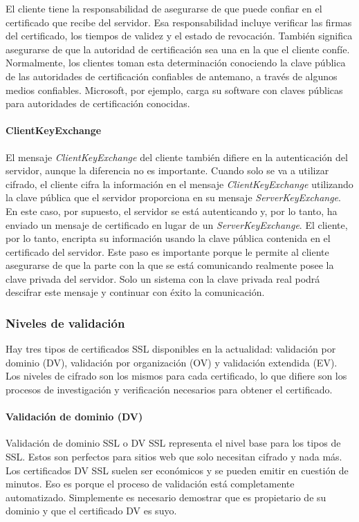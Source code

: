 El cliente tiene la responsabilidad de asegurarse de que puede confiar 
en el certificado que recibe del servidor. Esa responsabilidad incluye 
verificar las firmas del certificado, los tiempos de validez y el estado 
de revocación. También significa asegurarse de que la autoridad de 
certificación sea una en la que el cliente confíe. Normalmente, los clientes 
toman esta determinación conociendo la clave pública de las autoridades de 
certificación confiables de antemano, a través de algunos medios confiables. 
Microsoft, por ejemplo, carga su software con claves públicas para 
autoridades de certificación conocidas.

\paragraph*{ClientKeyExchange}
El mensaje \emph{ClientKeyExchange} del cliente también difiere en la autenticación 
del servidor, aunque la diferencia no es importante. Cuando solo se va a 
utilizar cifrado, el cliente cifra la información en el mensaje 
\emph{ClientKeyExchange}
utilizando la clave pública que el servidor proporciona en su mensaje 
\emph{ServerKeyExchange}. En este caso, por supuesto, el servidor se está 
autenticando y, por lo tanto, ha enviado un mensaje de certificado en 
lugar de un \emph{ServerKeyExchange}. El cliente, por lo tanto, encripta su 
información usando la clave pública contenida en el 
certificado del servidor. Este paso es importante porque le permite 
al cliente asegurarse de que la parte con la que se está comunicando 
realmente posee la clave privada del servidor. Solo un sistema con la 
clave privada real podrá descifrar este mensaje y continuar con éxito 
la comunicación.

 

\subsubsection*{Niveles de validación}  
Hay tres tipos de certificados SSL disponibles en la actualidad: validación por 
dominio (DV),
validación por organización (OV) y validación extendida (EV).
Los niveles de cifrado son los mismos para cada certificado, lo que difiere son los 
procesos de investigación y verificación necesarios para obtener el certificado.

\paragraph*{Validación de dominio (DV)}
Validación de dominio SSL o DV SSL representa el nivel base para los tipos de SSL. 
Estos son perfectos para sitios web que solo necesitan cifrado y nada más. Los 
certificados DV SSL suelen ser económicos y se pueden emitir en cuestión de minutos. 
Eso es porque el proceso de validación está completamente automatizado. Simplemente 
es necesario demostrar que es propietario de su dominio y que el certificado DV 
es suyo. 

